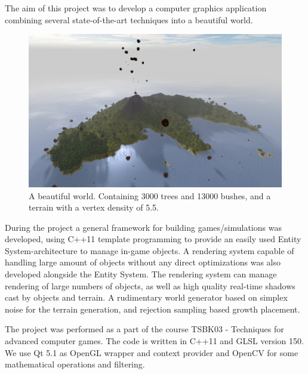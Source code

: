 The aim of this project was to develop a computer graphics application combining several state-of-the-art techniques into a beautiful world.
\begin{figure}[H]
  \centering
  \includegraphics[width=1.0\linewidth]{images/frontImage.jpg}
  \caption[A beautiful world.]{A beautiful world. Containing 3000 trees and 13000 bushes, and a terrain with a vertex density of 5.5.}
  \label{fig:beautifulIsland}
\end{figure}%

During the project a general framework for building games/simulations was developed, using C++11 template programming to provide an easily used Entity System-architecture to manage in-game objects. A rendering system capable of handling large amount of objects without any direct optimizations was also developed alongside the Entity System. The rendering system can manage rendering of large numbers of objects, as well as high quality real-time shadows cast by objects and terrain. A rudimentary world generator based on simplex noise for the terrain generation, and rejection sampling based growth placement.


The project was performed as a part of the course TSBK03 - Techniques for advanced computer games. The code is written in C++11 and GLSL version 150. We use Qt 5.1 as OpenGL wrapper and context provider and OpenCV for some mathematical operations and filtering.